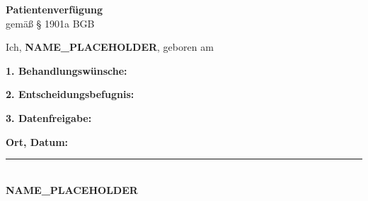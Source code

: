 \documentclass[a4paper,12pt]{article}
\begin{document}
\begin{center}
    \Large\textbf{Patientenverfügung}\\[0.3cm]
    \normalsize gemäß § 1901a BGB
\end{center}

\vspace{1cm}

Ich, \textbf{NAME_PLACEHOLDER}, geboren am %

\vspace{0.5cm}

\textbf{1. Behandlungswünsche:}


\vspace{0.5cm}

\textbf{2. Entscheidungsbefugnis:}


\vspace{0.5cm}

\textbf{3. Datenfreigabe:}


\vspace{1cm}

\textbf{Ort, Datum:} %

\vspace{2cm}

\rule{6cm}{0.4pt}\\
\textbf{NAME_PLACEHOLDER}
\end{document}

